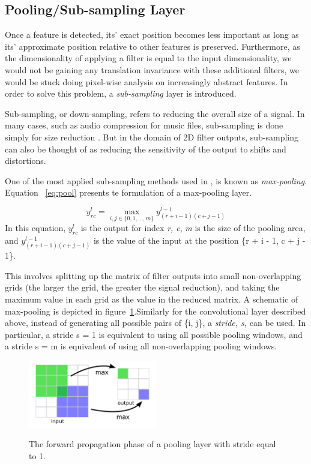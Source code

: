 \subsection{Pooling/Sub-sampling Layer}
\label{poolinglayer}
Once a feature is detected, its' exact position becomes less important as long as its' approximate position relative to other features is preserved. Furthermore, as the dimensionality of applying a filter is equal to the input dimensionality, we would not be gaining any translation invariance with these additional filters, we would be stuck doing pixel-wise analysis on increasingly abstract features. In order to solve this problem, a \textit{sub-sampling} layer is introduced.

 Sub-sampling, or down-sampling, refers to reducing the overall size of a signal. In many cases, such as audio compression for music files, sub-sampling is done simply for size reduction \cite{sub}. But in the domain of 2D filter outputs, sub-sampling  can also be thought of as reducing the sensitivity of the output to shifts and distortions.

One of the most applied sub-sampling methods used in \cite{lecun1995comparison}, is known as \textit{max-pooling}. Equation ~\ref{eq:pool} presents te formulation of a max-pooling layer. 

\begin{equation}
y_{rc}^{l} =  \max_{i,j\in\{0,1,...,m\} }  y_{(r+i-1)(c+j-1)}^{l-1}
\label{eq:pool}
\end{equation}
In this equation, $y_{rc}^{l}$ is the output for index \textit{{r, c}}, \textit{m} is the size of the pooling area, and $y_{(r+i-1)(c+j-1)}^{l-1}$ is the value of the input at the position \{r + i - 1, c + j - 1\}.


 
This involves splitting up the matrix of filter outputs into small non-overlapping grids (the larger the grid, the greater the signal reduction), and taking the maximum value in each grid as the value in the reduced matrix. A schematic of max-pooling is depicted in figure~\ref{fig:pooling}.Similarly for the convolutional layer described above, instead of generating all possible pairs of \{i, j\}, a \textit{stride, s,} can be used. In particular, a stride s = 1 is equivalent to using all possible pooling windows, and a stride s = m is equivalent of using all non-overlapping pooling windows.
\begin{figure}[H]
	\centering
	{\includegraphics[width=0.5\textwidth]{images/pooling}}
	\caption{The forward propagation phase of a pooling layer with stride equal to 1.}
	\label{fig:pooling}
\end{figure}
 
